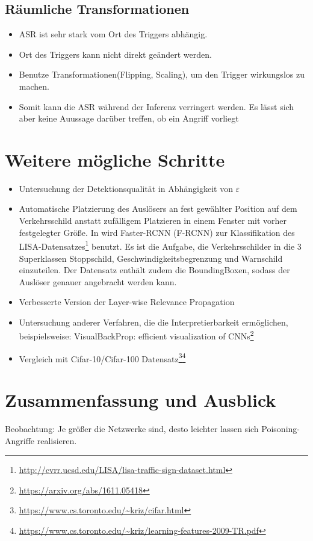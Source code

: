 \documentclass[11pt,a4paper]{article}
\numberwithin{equation}{section}
\begin{document}
	       
	\subsection{Räumliche Transformationen}
	\begin{itemize}
		\item ASR ist sehr stark vom Ort des Triggers abhängig.
		\item Ort des Triggers kann nicht direkt geändert werden.
		\item Benutze Transformationen(Flipping, Scaling), um den Trigger wirkungslos zu machen.
		\item Somit kann die ASR während der Inferenz verringert werden. Es lässt sich aber keine Auussage darüber treffen, ob ein Angriff vorliegt
	\end{itemize}
	\newpage
	\section{Weitere mögliche Schritte} \label{chapter_weitereSchritte}
	\begin{itemize}
		\item Untersuchung der Detektionsqualität in Abhängigkeit von $\varepsilon$
		\item Automatische Platzierung des Auslösers an fest gewählter Position auf dem Verkehrsschild anstatt zufälligem Platzieren in einem Fenster mit vorher festgelegter Größe. In \cite{badnets} wird  Faster-RCNN (F-RCNN) zur Klassifikation des LISA-Datensatzes\footnote{\url{http://cvrr.ucsd.edu/LISA/lisa-traffic-sign-dataset.html}} benutzt. Es ist die Aufgabe, die Verkehrsschilder in die 3 Superklassen Stoppschild, Geschwindigkeitsbegrenzung und Warnschild einzuteilen. Der Datensatz enthält zudem die BoundingBoxen, sodass der Auslöser genauer angebracht werden kann.
		\item Verbesserte Version der Layer-wise Relevance Propagation
		\item Untersuchung anderer Verfahren, die die Interpretierbarkeit ermöglichen, beispielsweise: VisualBackProp: efficient visualization of CNNs\footnote{\url{https://arxiv.org/abs/1611.05418}}
		\item Vergleich mit Cifar-10/Cifar-100 Datensatz\footnote{\url{https://www.cs.toronto.edu/~kriz/cifar.html}}\footnote{\url{https://www.cs.toronto.edu/~kriz/learning-features-2009-TR.pdf}}
	\end{itemize}
	
	
	\section{Zusammenfassung und Ausblick} \label{chapter_conclusion}
	Beobachtung: Je größer die Netzwerke sind, desto leichter lassen sich Poisoning-Angriffe realisieren.
	
\end{document}
